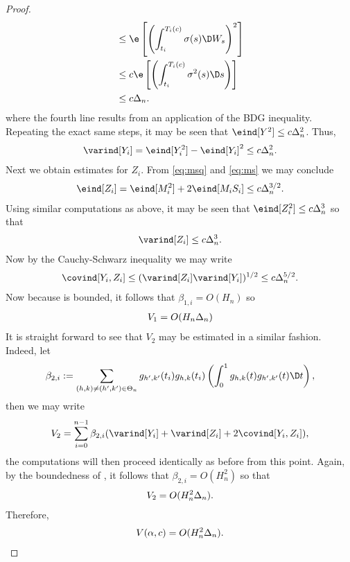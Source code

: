 \begin{appendices}
\begin{proof}
\begin{align}
&\le\e\left[ \left(\int^{T_i(c)}_{t_i} \sigma(s) \D W_s\right)^2\right]\notag\\
&\le c \e\left[ \left(\int^{T_i(c)}_{t_i} \sigma^2(s) \D s\right)\right]\notag\\
&\le c\Delta_n.
  \label{}
\end{align}
where the fourth line results from an application of the BDG inequality.  Repeating the exact same steps, it may be seen that $\eind[Y^2] \le c \Delta_n^2$. Thus,
\begin{align}
  \varind[Y_i] = \eind[Y_i^2] - \eind[Y_i]^2 \le c \Delta_n^2.
\end{align}
Next we obtain estimates for $Z_i$. From \eqref{eq:msq} and \eqref{eq:ms} we may conclude
\begin{align}
  \eind[Z_i] = \eind[M_i^2] + 2 \eind[M_i S_i] \le c \Delta_n^{3/2}. \notag
  \label{}
\end{align}
Using similar computations as above, it may be seen that $\eind[Z_i^2] \le c\Delta^3_n$ so that 
\begin{align}
  \varind[Z_i] \le c \Delta_n^3.\notag
  \label{}
\end{align}
Now by  the Cauchy-Schwarz inequality  we may write
\begin{align}
    \covind[Y_i, Z_i] \le (\varind[Z_i] \varind[Y_i])^{1/2} \le c \Delta_n^{5/2}. \notag
\end{align}
Now because \ghk is bounded, it follows that $\beta_{1,i} = O(H_n)$ so  
\begin{align}
  V_{1} = O(H_n\Delta_n)\notag
  \label{}
\end{align}
It is  straight forward to see  that $V_{2}$ may be estimated in a similar fashion. Indeed, let
\begin{align}
  \beta_{2,i} := \sum_{ (h,k) \ne (h',k') \in \Theta_n} g_{h',k'}(t_i)g_{h,k}(t_i)\left( \int_0^1 g_{h,k}(t) g_{h',k'}(t)\D t\right),\notag
  \label{}
\end{align}
then we may write
\begin{align}
  V_{2} = \sum_{i = 0}^{n-1} \beta_{2,i} (\varind[Y_i] + \varind[Z_i] + 2 \covind[Y_i,Z_i]), \notag
  \label{}
\end{align}
the computations will then proceed identically as before from this point. Again, by the boundedness of \ghk, it follows that   $ \beta_{2,i} = O(H_n^2)$ so that
\begin{align}
  V_{2} = O(H^2_n\Delta_n).\notag
  \label{}
\end{align}
Therefore,
\begin{align}
  V(\alpha,c)  = O(H^2_n\Delta_n).\notag
  \label{}
\end{align}
\end{proof}

\end{appendices}
